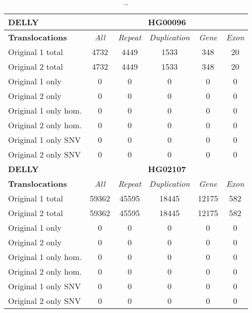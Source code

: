 \begin{table}[htb]
\begin{center}
\begin{tabular}{|l|c||c|c|c|c|}
\hline
{\bf DELLY} & \multicolumn{5}{|c|}{\bf HG00096} \\
\hline
\cline{2-6}
{\bf Translocations} & {\it All} & {\it Repeat} & {\it Duplication} & {\it Gene} & {\it Exon} \\
\hline
Original 1 total & 4732 & 4449 & 1533 & 348 & 20\\ 
\hline
Original 2 total & 4732 & 4449 & 1533 & 348 & 20\\ 
\hline
Original 1 only & 0 & 0 & 0 & 0 & 0\\ 
\hline
Original 2 only & 0 & 0 & 0 & 0 & 0\\ 
\hline
Original 1 only hom. & 0 & 0 & 0 & 0 & 0\\ 
\hline
Original 2 only hom. & 0 & 0 & 0 & 0 & 0\\ 
\hline
Original 1 only SNV & 0 & 0 & 0 & 0 & 0\\ 
\hline
Original 2 only SNV & 0 & 0 & 0 & 0 & 0\\ 
\hline
\hline
{\bf DELLY} & \multicolumn{5}{|c|}{\bf HG02107} \\
\hline
\cline{2-6}
{\bf Translocations} & {\it All} & {\it Repeat} & {\it Duplication} & {\it Gene} & {\it Exon} \\
\hline
Original 1 total & 59362 & 45595 & 18445 & 12175 & 582\\ 
\hline
Original 2 total & 59362 & 45595 & 18445 & 12175 & 582\\ 
\hline
Original 1 only & 0 & 0 & 0 & 0 & 0\\ 
\hline
Original 2 only & 0 & 0 & 0 & 0 & 0\\ 
\hline
Original 1 only hom. & 0 & 0 & 0 & 0 & 0\\ 
\hline
Original 2 only hom. & 0 & 0 & 0 & 0 & 0\\ 
\hline
Original 1 only SNV & 0 & 0 & 0 & 0 & 0\\ 
\hline
Original 2 only SNV & 0 & 0 & 0 & 0 & 0\\ 
\hline
\end{tabular}
\end{center}
\caption{ .. }
\label{tab:orig-vs-orig2-delly-trans}
\end{table}

